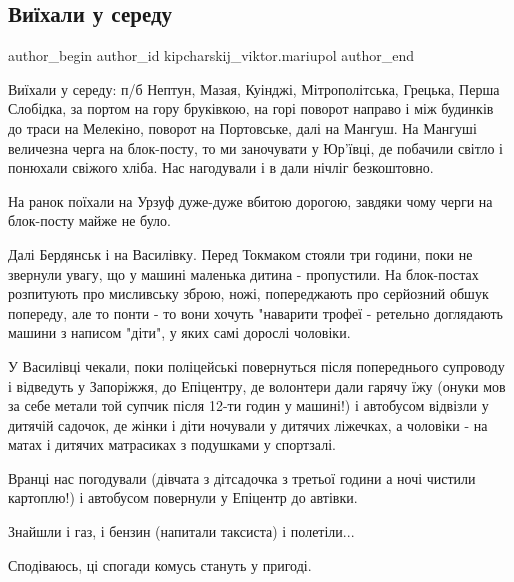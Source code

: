  
 
 
 
 

\subsection{Виїхали у середу}
\label{sec:19_03_2022.fb.kipcharskij_viktor.mariupol.1.vi_khali_u_seredu}

\ifcmt
 author_begin
   author_id kipcharskij_viktor.mariupol
 author_end
\fi

Виїхали у середу: п/б Нептун, Мазая, Куінджі, Мітрополітська, Грецька, Перша
Слобідка, за портом на гору бруківкою, на горі поворот направо і між будинків
до траси на Мелекіно, поворот на Портовське, далі на Мангуш. На Мангуші
величезна черга на блок-посту, то ми заночувати у Юр'ївці, де побачили світло і
понюхали свіжого хліба. Нас нагодували і в дали нічліг безкоштовно.

На ранок поїхали на Урзуф дуже-дуже вбитою дорогою, завдяки чому черги на
блок-посту майже не було.

Далі Бердянськ і на Василівку. Перед Токмаком стояли три години, поки не
звернули увагу, що у машині маленька дитина - пропустили. На блок-постах
розпитують про мисливську зброю, ножі, попереджають про серйозний обшук
попереду, але то понти - то вони хочуть "наварити трофеї - ретельно доглядають
машини з написом "діти", у яких самі дорослі чоловіки.

У Василівці чекали, поки поліцейські повернуться після попереднього супроводу і
відведуть у Запоріжжя, до Епіцентру, де волонтери дали гарячу їжу (онуки мов за
себе метали той супчик після 12-ти годин у машині!) і автобусом відвізли у
дитячій садочок, де жінки і діти ночували у дитячих ліжечках, а чоловіки - на
матах і дитячих матрасиках з подушками у спортзалі.

Вранці нас погодували (дівчата з дітсадочка з третьої години а ночі чистили
картоплю!) і автобусом повернули у Епіцентр до автівки.

Знайшли і газ, і бензин (напитали таксиста) і полетіли...

Сподіваюсь, ці спогади комусь стануть у пригоді.

